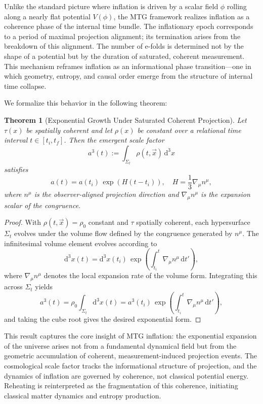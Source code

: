 \documentclass[11pt]{article}
\newtheorem{theorem}{Theorem}
\begin{document}
Unlike the standard picture where inflation is driven by a scalar field \( \phi \) rolling along a nearly flat potential \( V(\phi) \), the MTG framework realizes inflation as a coherence phase of the internal time bundle. The inflationary epoch corresponds to a period of maximal projection alignment; its termination arises from the breakdown of this alignment. The number of e-folds is determined not by the shape of a potential but by the duration of saturated, coherent measurement. This mechanism reframes inflation as an informational phase transition—one in which geometry, entropy, and causal order emerge from the structure of internal time collapse.

We formalize this behavior in the following theorem:

\begin{theorem}[Exponential Growth Under Saturated Coherent Projection]
Let $\tau(x)$ be spatially coherent and let $\rho(x)$ be constant over a relational time interval $t \in [t_i, t_f]$. Then the emergent scale factor
\[
a^3(t) := \int_{\Sigma_t} \rho(t, \vec{x}) \, \mathrm{d}^3 x
\]
satisfies
\[
a(t) = a(t_i) \, \exp\left( H (t - t_i) \right), \quad H = \frac{1}{3} \nabla_\mu n^\mu,
\]
where $n^\mu$ is the observer-aligned projection direction and $\nabla_\mu n^\mu$ is the expansion scalar of the congruence.
\end{theorem}

\begin{proof}
With $\rho(t, \vec{x}) = \rho_0$ constant and $\tau$ spatially coherent, each hypersurface $\Sigma_t$ evolves under the volume flow defined by the congruence generated by $n^\mu$. The infinitesimal volume element evolves according to
\[
\mathrm{d}^3 x(t) = \mathrm{d}^3 x(t_i) \, \exp\left( \int_{t_i}^t \nabla_\mu n^\mu \, \mathrm{d}t' \right),
\]
where $\nabla_\mu n^\mu$ denotes the local expansion rate of the volume form. Integrating this across $\Sigma_t$ yields
\[
a^3(t) = \rho_0 \int_{\Sigma_t} \mathrm{d}^3 x(t) = a^3(t_i) \, \exp\left( \int_{t_i}^t \nabla_\mu n^\mu \, \mathrm{d}t' \right),
\]
and taking the cube root gives the desired exponential form.
\end{proof}

This result captures the core insight of MTG inflation: the exponential expansion of the universe arises not from a fundamental dynamical field but from the geometric accumulation of coherent, measurement-induced projection events. The cosmological scale factor tracks the informational structure of projection, and the dynamics of inflation are governed by coherence, not classical potential energy. Reheating is reinterpreted as the fragmentation of this coherence, initiating classical matter dynamics and entropy production.
\end{document}
